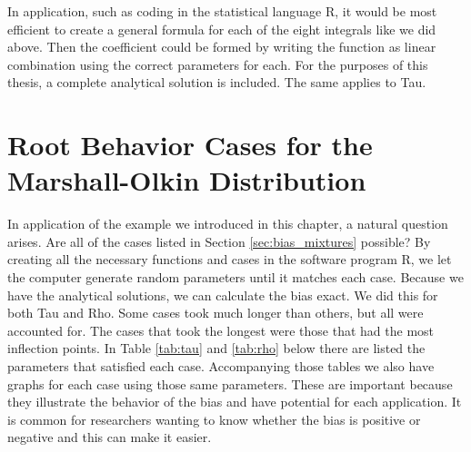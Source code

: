 In application, such as coding in the statistical language R, it would be most efficient to create a general formula for each of the eight integrals like we did above. Then the coefficient could be formed by writing the function as linear combination using the correct parameters for each. For the purposes of this thesis, a complete analytical solution is included. The same applies to Tau.
\section{Root Behavior Cases for the Marshall-Olkin Distribution}\label{sec:cases}
\hspace{24pt} In application of the example we introduced in this chapter, a natural question arises. Are all of the cases listed in Section \ref{sec:bias_mixtures} possible? By creating all the necessary functions and cases in the software program R, we let the computer generate random parameters until it matches each case. Because we have the analytical solutions, we can calculate the bias exact. We did this for both Tau and Rho. Some cases took much longer than others, but all were accounted for. The cases that took the longest were those that had the most inflection points. In Table \ref{tab:tau} and \ref{tab:rho} below there are listed the parameters that satisfied each case. Accompanying those tables we also have graphs for each case using those same parameters. These are important because they illustrate the behavior of the bias and have potential for each application. It is common for researchers wanting to know whether the bias is positive or negative and this can make it easier.
\renewcommand{\arraystretch}{0.7}
